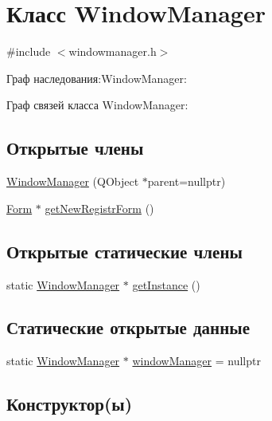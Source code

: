 \hypertarget{class_window_manager}{}\section{Класс Window\+Manager}
\label{class_window_manager}


{\ttfamily \#include $<$windowmanager.\+h$>$}



Граф наследования\+:Window\+Manager\+:


Граф связей класса Window\+Manager\+:
\subsection*{Открытые члены}
\begin{DoxyCompactItemize}
\item 
\hyperlink{class_window_manager_a5b7800023311856090555511d8c5b3e1}{Window\+Manager} (Q\+Object $\ast$parent=nullptr)
\item 
\hyperlink{class_form}{Form} $\ast$ \hyperlink{class_window_manager_a8f2e28f6011da17a58aa1f31f57508f0}{get\+New\+Registr\+Form} ()
\end{DoxyCompactItemize}
\subsection*{Открытые статические члены}
\begin{DoxyCompactItemize}
\item 
static \hyperlink{class_window_manager}{Window\+Manager} $\ast$ \hyperlink{class_window_manager_a788e5991ead0a077b39dcd25f3116192}{get\+Instance} ()
\end{DoxyCompactItemize}
\subsection*{Статические открытые данные}
\begin{DoxyCompactItemize}
\item 
static \hyperlink{class_window_manager}{Window\+Manager} $\ast$ \hyperlink{class_window_manager_aeac5c58442c8ec0caff4bdb96660d2d6}{window\+Manager} = nullptr
\end{DoxyCompactItemize}


\subsection{Конструктор(ы)}
\mbox{\label{class_window_manager_a5b7800023311856090555511d8c5b3e1}} 

